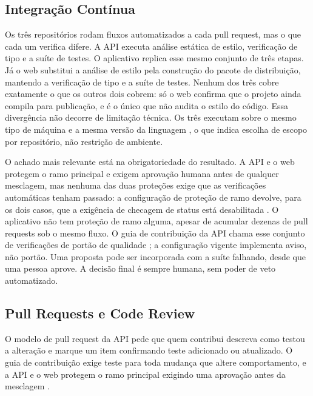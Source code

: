 
\subsection{Integração Contínua}

Os três repositórios rodam fluxos automatizados a cada pull request, mas o
que cada um verifica difere. A API executa análise estática de estilo,
verificação de tipo e a suíte de testes. O aplicativo replica esse mesmo conjunto
de três etapas. Já o web substitui a análise de estilo pela construção do pacote
de distribuição, mantendo a verificação de tipo e a suíte de testes. Nenhum dos
três cobre exatamente o que os outros dois cobrem: só o web confirma que o
projeto ainda compila para publicação, e é o único que não audita o estilo do
código. Essa divergência não decorre de limitação técnica. Os três executam sobre
o mesmo tipo de máquina e a mesma versão da linguagem \cite{educado-repos}, o que
indica escolha de escopo por repositório, não restrição de ambiente.

O achado mais relevante está na obrigatoriedade do resultado. A API e o web
protegem o ramo principal e exigem aprovação humana antes de qualquer mesclagem,
mas nenhuma das duas proteções exige que as verificações automáticas tenham
passado: a configuração de proteção de ramo devolve, para os dois casos, que a
exigência de checagem de status está desabilitada \cite{educado-repos}. O
aplicativo não tem proteção de ramo alguma, apesar de acumular dezenas de
pull requests sob o mesmo fluxo. O guia de contribuição da API chama esse conjunto de verificações de
portão de qualidade \cite{educado-repos}; a configuração vigente implementa
aviso, não portão. Uma
proposta pode ser incorporada com a suíte falhando, desde que uma pessoa aprove.
A decisão final é sempre humana, sem poder de veto automatizado.


\subsection{Pull Requests e Code Review}

O modelo de pull request da API pede que quem contribui descreva como
testou a alteração e marque um item confirmando teste adicionado ou atualizado. O
guia de contribuição exige teste para toda mudança que altere comportamento, e a
API e o web protegem o ramo principal exigindo uma aprovação antes da mesclagem \cite{educado-repos}.

